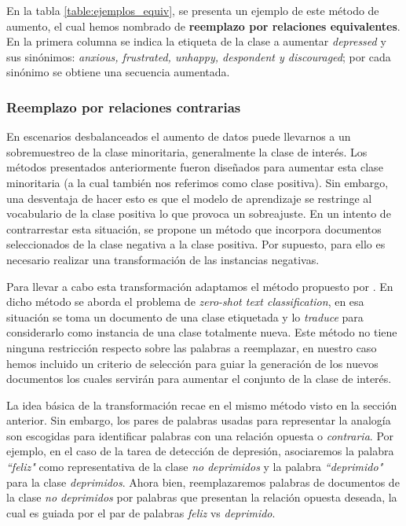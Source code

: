 En la tabla \ref{table:ejemplos_equiv}, se presenta un ejemplo de este método de aumento, el cual hemos nombrado de \textbf{reemplazo por relaciones equivalentes}.
En la primera columna se indica la etiqueta de la clase a aumentar \textit{depressed} y sus sinónimos: \textit{anxious, frustrated, unhappy, despondent y discouraged}; por cada sinónimo se obtiene una secuencia aumentada.




\subsubsection{Reemplazo por relaciones contrarias}

En escenarios desbalanceados el aumento de datos puede llevarnos a un sobremuestreo de la clase minoritaria, generalmente la clase de interés. Los métodos presentados anteriormente fueron diseñados para aumentar esta clase minoritaria (a la cual también nos referimos como clase positiva). Sin embargo, una desventaja de hacer esto es que el modelo de aprendizaje se restringe al vocabulario de la clase positiva lo que provoca un sobreajuste. En un intento de contrarrestar esta situación, se propone un método que incorpora documentos seleccionados de la clase negativa a la clase positiva. Por supuesto, para ello es necesario realizar una transformación de las instancias negativas.

Para llevar a cabo esta transformación adaptamos el método propuesto por \citep{zhang2019integrating}. En dicho método se aborda el problema de  \textit{zero-shot text classification}, en esa situación se toma un documento de una clase etiquetada y lo \textit{traduce} para considerarlo como instancia de una clase totalmente nueva. Este método no tiene ninguna restricción respecto sobre las palabras a reemplazar, en nuestro caso hemos incluido un criterio de selección para guiar la generación de los nuevos documentos los cuales servirán para aumentar el conjunto de la clase de interés.   

La idea básica de la transformación recae en el mismo método visto en la sección anterior. Sin embargo, los pares de palabras usadas para representar la analogía son escogidas para identificar palabras con una relación opuesta o \textit{contraria}. Por ejemplo, en el caso de la tarea de detección de depresión, asociaremos la palabra \textit{``feliz"} como representativa de la clase \textit{no deprimidos}  y la palabra \textit{``deprimido"} para la clase \textit{deprimidos}. Ahora bien, reemplazaremos palabras de documentos de la clase \textit{no deprimidos} por palabras que presentan la relación opuesta deseada, la cual es guiada por el par de palabras \textit{feliz} vs \textit{deprimido}. 

